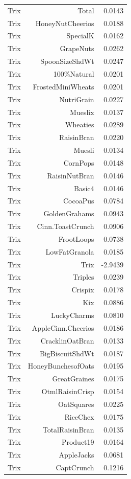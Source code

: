 \begin{longtable}{@{}lrr@{}}
Trix & Total & 0.0143 \\
Trix & HoneyNutCheerios & 0.0188 \\
Trix & SpecialK & 0.0162 \\
Trix & GrapeNuts & 0.0262 \\
Trix & SpoonSizeShdWt & 0.0247 \\
Trix & 100\%Natural & 0.0201 \\
Trix & FrostedMiniWheats & 0.0201 \\
Trix & NutriGrain & 0.0227 \\
Trix & Mueslix & 0.0137 \\
Trix & Wheaties & 0.0289 \\
Trix & RaisinBran & 0.0220 \\
Trix & Muesli & 0.0134 \\
Trix & CornPops & 0.0148 \\
Trix & RaisinNutBran & 0.0146 \\
Trix & Basic4 & 0.0146 \\
Trix & CocoaPus & 0.0784 \\
Trix & GoldenGrahams & 0.0943 \\
Trix & Cinn.ToastCrunch & 0.0906 \\
Trix & FrootLoops & 0.0738 \\
Trix & LowFatGranola & 0.0185 \\
Trix & Trix & -2.9439 \\
Trix & Triples & 0.0239 \\
Trix & Crispix & 0.0178 \\
Trix & Kix & 0.0886 \\
Trix & LuckyCharms & 0.0810 \\
Trix & AppleCinn.Cheerios & 0.0186 \\
Trix & CracklinOatBran & 0.0133 \\
Trix & BigBiscuitShdWt & 0.0187 \\
Trix & HoneyBunchesofOats & 0.0195 \\
Trix & GreatGraines & 0.0175 \\
Trix & OtmlRaisinCrisp & 0.0154 \\
Trix & OatSquares & 0.0225 \\
Trix & RiceChex & 0.0175 \\
Trix & TotalRaisinBran & 0.0135 \\
Trix & Product19 & 0.0164 \\
Trix & AppleJacks & 0.0681 \\
Trix & CaptCrunch & 0.1216 \\

\end{longtable}
